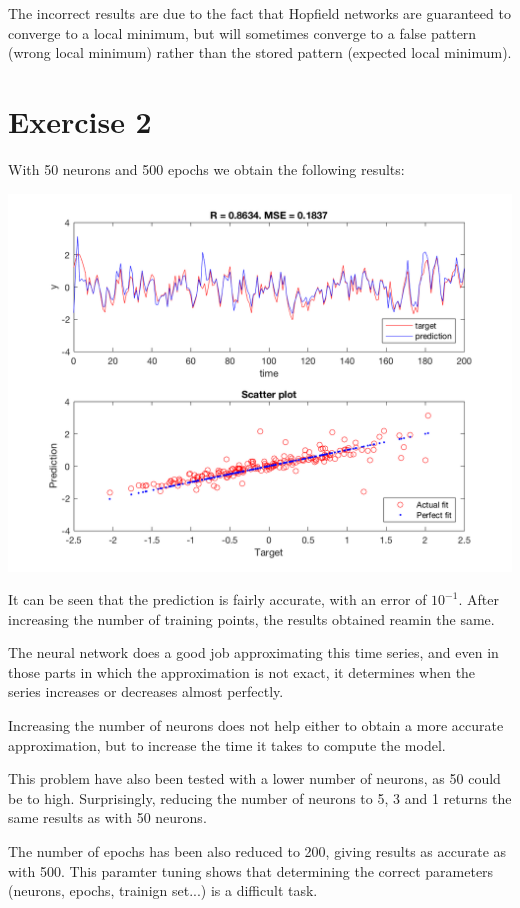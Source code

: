 \documentclass[10pt]{article}
\begin{document}
\begin{multicols}{2}
The incorrect results are due to the fact that Hopfield networks are guaranteed to converge to a local minimum,
but will sometimes converge to a false pattern (wrong local minimum) rather than the stored pattern (expected local minimum).

\section*{Exercise 2}
With 50 neurons and 500 epochs we obtain the following results:
\begin{center}
	\includegraphics[width=\linewidth]{img/elman1}
\end{center}
It can be seen that the prediction is fairly accurate, with an error of $10^{-1}$. After increasing the number
of training points, the results obtained reamin the same.

The neural network does a good job approximating this time series, and even in those parts in which the approximation
is not exact, it determines when the series increases or decreases almost perfectly.

Increasing the number of neurons does not help either to obtain a more accurate approximation, but to increase the time it takes to
compute the model.

This problem have also been tested with a lower number of neurons, as 50 could be to high. Surprisingly, reducing the number of neurons
to 5, 3 and 1 returns the same results as with 50 neurons.

The number of epochs has been also reduced to 200, giving results as accurate as with 500. This paramter tuning shows that
determining the correct parameters (neurons, epochs, trainign set...) is a difficult task.

\end{multicols}
\end{document}
